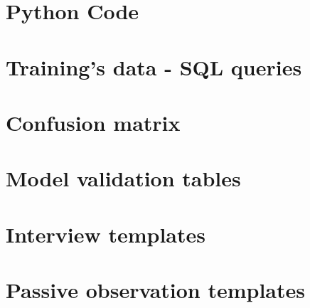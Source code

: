\appendix
\chapter{Python Code} \label{python_code}

\chapter{Training's data - SQL queries} \label{sql_queries_for_trainingdata}

\chapter{Confusion matrix} \label{confusion_matrix}

\chapter{Model validation tables} \label{model_validation_tables}

\chapter{Interview templates} \label{interview_templates}

\chapter{Passive observation templates} \label{passive_obs_templates}

